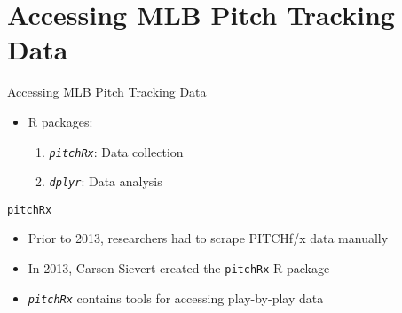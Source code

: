 \section{Accessing MLB Pitch Tracking
Data}\label{accessing-mlb-pitch-tracking-data}

\begin{frame}[fragile]{Accessing MLB Pitch Tracking Data}

\begin{itemize}
\tightlist
\item
  R packages:

  \begin{enumerate}
  \def\labelenumi{\arabic{enumi}.}
  \tightlist
  \item
    \emph{\texttt{pitchRx}}: Data collection
  \item
    \emph{\texttt{dplyr}}: Data analysis
  \end{enumerate}
\end{itemize}

\end{frame}

\begin{frame}[fragile]{\texttt{pitchRx}}

\begin{itemize}
\tightlist
\item
  Prior to 2013, researchers had to scrape PITCHf/x data manually
\item
  In 2013, Carson Sievert created the \texttt{pitchRx} R package
\item
  \emph{\texttt{pitchRx}} contains tools for accessing play-by-play data
\end{itemize}

\footnotesize

\begin{Shaded}
\begin{Highlighting}[]
\StringTok{ }\NormalTok{(}\NormalTok{, } \NormalTok{)}
\StringTok{ }\NormalTok{(}\NormalTok{, }\NormalTok{, }\NormalTok{)}
\NormalTok{(} \NormalTok{, } \NormalTok{, } 
   
\StringTok{ }\NormalTok{(}\NormalTok{)}
\end{Highlighting}
\end{Shaded}

\end{frame}


